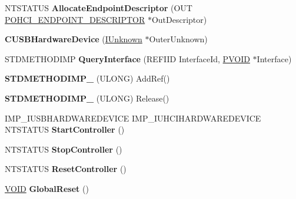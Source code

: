\begin{DoxyCompactItemize}
N\+T\+S\+T\+A\+T\+US {\bfseries Allocate\+Endpoint\+Descriptor} (O\+UT \hyperlink{struct___o_h_c_i___e_n_d_p_o_i_n_t___d_e_s_c_r_i_p_t_o_r}{P\+O\+H\+C\+I\+\_\+\+E\+N\+D\+P\+O\+I\+N\+T\+\_\+\+D\+E\+S\+C\+R\+I\+P\+T\+OR} $\ast$Out\+Descriptor)
\item 
\mbox{\label{class_c_u_s_b_hardware_device_aa2b87081242b129aa1b4cfab189e0265}} 
{\bfseries C\+U\+S\+B\+Hardware\+Device} (\hyperlink{interface_i_unknown}{I\+Unknown} $\ast$Outer\+Unknown)
\item 
\mbox{\label{class_c_u_s_b_hardware_device_add03c1ce4739d30eb3120b009009b1ad}} 
S\+T\+D\+M\+E\+T\+H\+O\+D\+I\+MP {\bfseries Query\+Interface} (R\+E\+F\+I\+ID Interface\+Id, \hyperlink{interfacevoid}{P\+V\+O\+ID} $\ast$Interface)
\item 
\mbox{\label{class_c_u_s_b_hardware_device_a64dbb65e59d97d17de77e02c4d692bdb}} 
{\bfseries S\+T\+D\+M\+E\+T\+H\+O\+D\+I\+M\+P\+\_\+} (U\+L\+O\+NG) Add\+Ref()
\item 
\mbox{\label{class_c_u_s_b_hardware_device_afe685aebe72aac9ebe1e83a0af2dbd56}} 
{\bfseries S\+T\+D\+M\+E\+T\+H\+O\+D\+I\+M\+P\+\_\+} (U\+L\+O\+NG) Release()
\item 
\mbox{\label{class_c_u_s_b_hardware_device_a787c3b26e38d93ee3d48dda9a9c5b765}} 
I\+M\+P\+\_\+\+I\+U\+S\+B\+H\+A\+R\+D\+W\+A\+R\+E\+D\+E\+V\+I\+CE I\+M\+P\+\_\+\+I\+U\+H\+C\+I\+H\+A\+R\+D\+W\+A\+R\+E\+D\+E\+V\+I\+CE N\+T\+S\+T\+A\+T\+US {\bfseries Start\+Controller} ()
\item 
\mbox{\label{class_c_u_s_b_hardware_device_a457e6a85dd887c65fda56bac77ea8d56}} 
N\+T\+S\+T\+A\+T\+US {\bfseries Stop\+Controller} ()
\item 
\mbox{\label{class_c_u_s_b_hardware_device_a84a15867f7e6a65292aef356a13c532f}} 
N\+T\+S\+T\+A\+T\+US {\bfseries Reset\+Controller} ()
\item 
\mbox{\label{class_c_u_s_b_hardware_device_a02bf0845c4e4c26525135ee617440e51}} 
\hyperlink{interfacevoid}{V\+O\+ID} {\bfseries Global\+Reset} ()

\end{DoxyCompactItemize}

